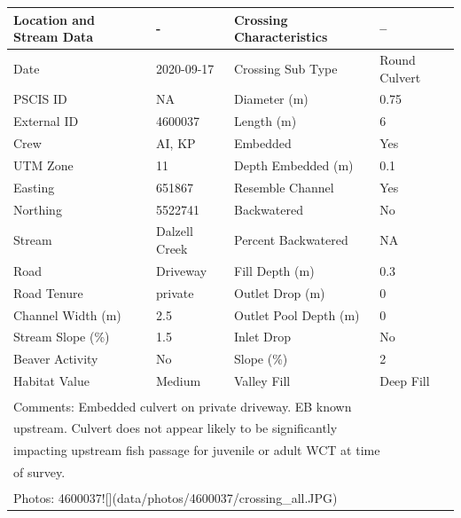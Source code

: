 \documentclass[
]{book}
\begin{document}
\begin{tabular}{llll}
\toprule
Location and Stream Data & - & Crossing Characteristics & --\\
\midrule
Date & 2020-09-17 & Crossing Sub Type & Round Culvert\\
PSCIS ID & NA & Diameter (m) & 0.75\\
External ID & 4600037 & Length (m) & 6\\
Crew & AI, KP & Embedded & Yes\\
UTM Zone & 11 & Depth Embedded (m) & 0.1\\
\addlinespace
Easting & 651867 & Resemble Channel & Yes\\
Northing & 5522741 & Backwatered & No\\
Stream & Dalzell Creek & Percent Backwatered & NA\\
Road & Driveway & Fill Depth (m) & 0.3\\
Road Tenure & private & Outlet Drop (m) & 0\\
\addlinespace
Channel Width (m) & 2.5 & Outlet Pool Depth (m) & 0\\
Stream Slope (\%) & 1.5 & Inlet Drop & No\\
Beaver Activity & No & Slope (\%) & 2\\
Habitat Value & Medium & Valley Fill & Deep Fill\\
\bottomrule
\multicolumn{4}{l}{\textsuperscript{} Comments: Embedded culvert on private driveway. EB known}\\
\multicolumn{4}{l}{upstream. Culvert does not appear likely to be significantly}\\
\multicolumn{4}{l}{impacting upstream fish passage for juvenile or adult WCT at time}\\
\multicolumn{4}{l}{of survey.}\\
\multicolumn{4}{l}{\textsuperscript{} Photos: 4600037![](data/photos/4600037/crossing\_all.JPG)}\\
\end{tabular}
\end{document}
